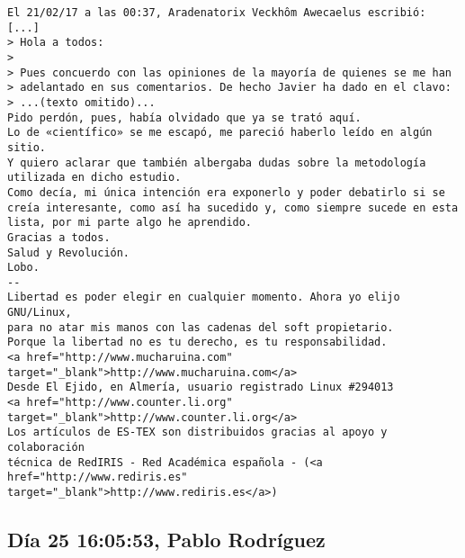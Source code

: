 \documentclass[a4paper,10pt]{article}
\begin{document}
\begin{lstlisting}
El 21/02/17 a las 00:37, Aradenatorix Veckhôm Awecaelus escribió:
[...]
> Hola a todos:
> 
> Pues concuerdo con las opiniones de la mayoría de quienes se me han
> adelantado en sus comentarios. De hecho Javier ha dado en el clavo:
> ...(texto omitido)...
Pido perdón, pues, había olvidado que ya se trató aquí.
Lo de «científico» se me escapó, me pareció haberlo leído en algún sitio.
Y quiero aclarar que también albergaba dudas sobre la metodología
utilizada en dicho estudio.
Como decía, mi única intención era exponerlo y poder debatirlo si se
creía interesante, como así ha sucedido y, como siempre sucede en esta
lista, por mi parte algo he aprendido.
Gracias a todos.
Salud y Revolución.
Lobo.
-- 
Libertad es poder elegir en cualquier momento. Ahora yo elijo GNU/Linux,
para no atar mis manos con las cadenas del soft propietario.
Porque la libertad no es tu derecho, es tu responsabilidad.
<a href="http://www.mucharuina.com" target="_blank">http://www.mucharuina.com</a>
Desde El Ejido, en Almería, usuario registrado Linux #294013
<a href="http://www.counter.li.org" target="_blank">http://www.counter.li.org</a>
Los artículos de ES-TEX son distribuidos gracias al apoyo y colaboración 
técnica de RedIRIS - Red Académica española - (<a href="http://www.rediris.es" target="_blank">http://www.rediris.es</a>)

\end{lstlisting}

\subsection{Día 25 16:05:53, Pablo Rodríguez}
\end{document}
